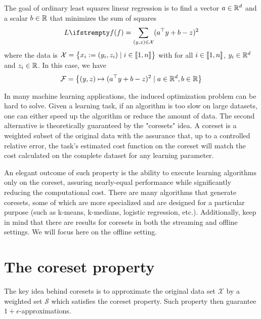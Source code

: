 \begin{example}
    The goal of ordinary least squares linear regression is to find a vector $a \in \mathbb{R}^d$ and a scalar $b \in \mathbb{R}$ that minimizes the sum of squares 
    \begin{equation*}
        \loss{\query} = \sum_{(y,z)\in \mathcal{X}} (a\T y +b -z)^2
    \end{equation*}
    where the data is $\mathcal{X} =\begin{Bmatrix}x_i :=(y_{i}, z_i) \mid i\in \llbracket 1,n \rrbracket\end{Bmatrix}$ with for all $i\in \llbracket 1,n \rrbracket$, $y_i \in \mathbb{R}^d$ and $z_i \in \mathbb{R}$. In this case, we have \begin{equation*}
        \mathcal{F} = \left\{(y,z) \mapsto (a^\top y + b -z)^2 \mid a \in \mathbb{R}^d, b \in \mathbb{R}\right\} 
    \end{equation*}
\end{example}
    

In many machine learning applications, the induced optimization problem can be hard to solve. Given a learning task, if an algorithm is too slow on large datasets, one can either speed up the algorithm or reduce the amount of data.
The second alternative is theoretically guaranteed by the "coresets" idea.
A coreset is a weighted subset of the original data with the assurance that, up to a controlled relative error, the task's estimated cost function on the coreset will match the cost calculated on the complete dataset for any learning parameter.

An elegant outcome of such property is the ability to execute learning algorithms only on the coreset, assuring nearly-equal performance while significantly reducing the computational cost. There are many algorithms that generate coresets, some of which are more specialized and are designed for a particular purpose (such as k-means, k-medians, logistic regression, etc.). Additionally, keep in mind that there are results for coresets in both the streaming and offline settings. We will focus here on the offline setting.


\section{The coreset property}

The key idea behind coresets is to approximate the original data
set $\mathcal{X}$ by a weighted set $\mathcal{S}$ which satisfies the coreset property. Such property then guarantee $1+\epsilon$-approximations.

